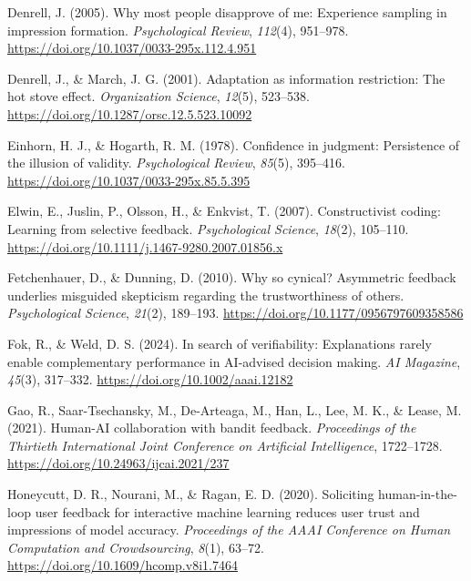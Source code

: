 \documentclass[
  british,
  11pt,
]{article}
\newlength{\cslhangindent}
\newenvironment{CSLReferences}[2] %
 {\begin{list}{}{%
  \setlength{\itemindent}{0pt}
  \setlength{\leftmargin}{0pt}
  \setlength{\parsep}{0pt}
  \ifodd #1
   \setlength{\leftmargin}{\cslhangindent}
   \setlength{\itemindent}{-1\cslhangindent}
  \fi
  \setlength{\itemsep}{#2\baselineskip}}}
 {\end{list}}
\begin{document}
\protect{}\label{refs}
\begin{CSLReferences}{1}{0}
Denrell, J. (2005). Why most people disapprove of me: Experience
sampling in impression formation. \emph{Psychological Review},
\emph{112}(4), 951--978.
\url{https://doi.org/10.1037/0033-295x.112.4.951}

Denrell, J., \& March, J. G. (2001). Adaptation as information
restriction: The hot stove effect. \emph{Organization Science},
\emph{12}(5), 523--538.
\url{https://doi.org/10.1287/orsc.12.5.523.10092}

Einhorn, H. J., \& Hogarth, R. M. (1978). Confidence in judgment:
Persistence of the illusion of validity. \emph{Psychological Review},
\emph{85}(5), 395--416. \url{https://doi.org/10.1037/0033-295x.85.5.395}

Elwin, E., Juslin, P., Olsson, H., \& Enkvist, T. (2007). Constructivist
coding: Learning from selective feedback. \emph{Psychological Science},
\emph{18}(2), 105--110.
\url{https://doi.org/10.1111/j.1467-9280.2007.01856.x}

Fetchenhauer, D., \& Dunning, D. (2010). Why so cynical? Asymmetric
feedback underlies misguided skepticism regarding the trustworthiness of
others. \emph{Psychological Science}, \emph{21}(2), 189--193.
\url{https://doi.org/10.1177/0956797609358586}

Fok, R., \& Weld, D. S. (2024). In search of verifiability: Explanations
rarely enable complementary performance in AI-advised decision making.
\emph{AI Magazine}, \emph{45}(3), 317--332.
\url{https://doi.org/10.1002/aaai.12182}

Gao, R., Saar-Tsechansky, M., De-Arteaga, M., Han, L., Lee, M. K., \&
Lease, M. (2021). Human-AI collaboration with bandit feedback.
\emph{Proceedings of the Thirtieth International Joint Conference on
Artificial Intelligence}, 1722--1728.
\url{https://doi.org/10.24963/ijcai.2021/237}

Honeycutt, D. R., Nourani, M., \& Ragan, E. D. (2020). Soliciting
human-in-the-loop user feedback for interactive machine learning reduces
user trust and impressions of model accuracy. \emph{Proceedings of the
AAAI Conference on Human Computation and Crowdsourcing}, \emph{8}(1),
63--72. \url{https://doi.org/10.1609/hcomp.v8i1.7464}


\end{CSLReferences}
\end{document}
